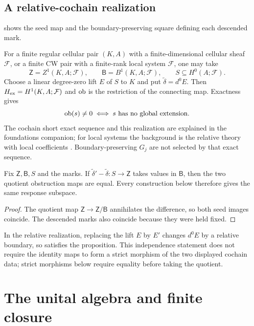 \documentclass[11pt,a4paper]{article}
\begin{document}
\subsection{A relative-cochain realization}

 shows the seed map and the boundary-preserving
square defining each descended mark.


For a finite regular cellular pair $(K,A)$ with a finite-dimensional
cellular sheaf $\mathcal F$, or a finite CW pair with a finite-rank local
system $\mathcal F$, one may take
\[
 \mathsf Z=Z^1(K,A;\mathcal F),\qquad
 \mathsf B=B^1(K,A;\mathcal F),\qquad S\subseteq H^0(A;\mathcal F).
\]
Choose a linear degree-zero lift $E$ of $S$ to $K$ and put
$\widetilde\delta=d^0E$.  Then $H_{\mathrm{ex}}=H^1(K,A;\mathcal F)$ and
$\operatorname{ob}$ is the restriction of the connecting map.  Exactness gives
\[
 \operatorname{ob}(s)\ne0\iff s\text{ has no global extension}.
\]
The cochain short exact sequence and this realization are explained in
the foundations companion; for local systems the background is the
relative theory with local coefficients \cite[Section 3.H]{hatcher}.
Boundary-preserving $G_j$ are not selected by that exact sequence.

\begin{proposition}
\label{prop:seed-choice}
Fix $\mathsf Z,\mathsf B,S$ and the marks.  If
$\widetilde\delta'-\widetilde\delta:S\to\mathsf Z$ takes values in
$\mathsf B$, then the two quotient obstruction maps are equal.  Every
construction below therefore gives the same response subspace.
\end{proposition}

\begin{proof}
The quotient map $\mathsf Z\to\mathsf Z/\mathsf B$ annihilates the
difference, so both seed images coincide.  The descended marks also
coincide because they were held fixed.
\end{proof}

In the relative realization, replacing the lift $E$ by $E'$ changes
$d^0E$ by a relative boundary, so satisfies the proposition.  This
independence statement does not require the identity maps to form a
strict morphism of the two displayed cochain data; strict morphisms below
require equality before taking the quotient.

\section{The unital algebra and finite closure}
\label{sec:closure}
\end{document}
